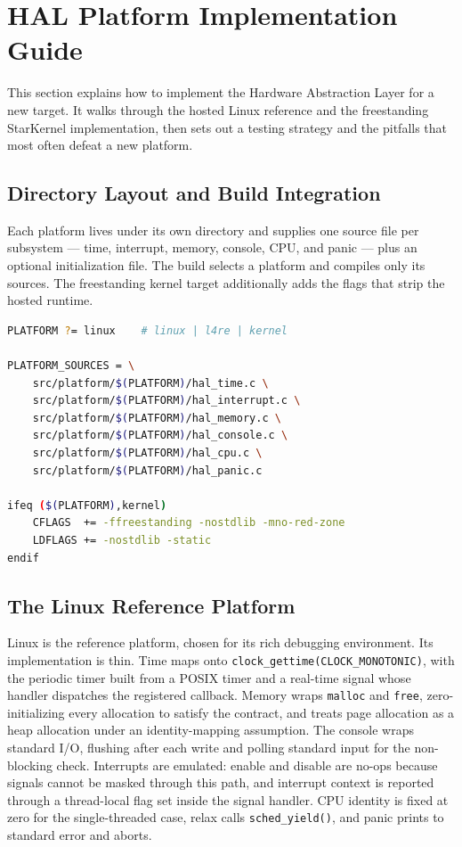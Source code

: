 
\section{HAL Platform Implementation Guide}

This section explains how to implement the Hardware Abstraction Layer for a new
target. It walks through the hosted Linux reference and the freestanding
StarKernel implementation, then sets out a testing strategy and the pitfalls
that most often defeat a new platform.

\subsection{Directory Layout and Build Integration}

Each platform lives under its own directory and supplies one source file per
subsystem --- time, interrupt, memory, console, CPU, and panic --- plus an
optional initialization file. The build selects a platform and compiles only its
sources. The freestanding kernel target additionally adds the flags that strip
the hosted runtime.

\begin{lstlisting}[language=bash]
PLATFORM ?= linux    # linux | l4re | kernel

PLATFORM_SOURCES = \
    src/platform/$(PLATFORM)/hal_time.c \
    src/platform/$(PLATFORM)/hal_interrupt.c \
    src/platform/$(PLATFORM)/hal_memory.c \
    src/platform/$(PLATFORM)/hal_console.c \
    src/platform/$(PLATFORM)/hal_cpu.c \
    src/platform/$(PLATFORM)/hal_panic.c

ifeq ($(PLATFORM),kernel)
    CFLAGS  += -ffreestanding -nostdlib -mno-red-zone
    LDFLAGS += -nostdlib -static
endif
\end{lstlisting}

\subsection{The Linux Reference Platform}

Linux is the reference platform, chosen for its rich debugging environment. Its
implementation is thin. Time maps onto \texttt{clock\_gettime(CLOCK\_MONOTONIC)},
with the periodic timer built from a POSIX timer and a real-time signal whose
handler dispatches the registered callback. Memory wraps \texttt{malloc} and
\texttt{free}, zero-initializing every allocation to satisfy the contract, and
treats page allocation as a heap allocation under an identity-mapping
assumption. The console wraps standard I/O, flushing after each write and polling
standard input for the non-blocking check. Interrupts are emulated: enable and
disable are no-ops because signals cannot be masked through this path, and
interrupt context is reported through a thread-local flag set inside the signal
handler. CPU identity is fixed at zero for the single-threaded case, relax calls
\texttt{sched\_yield()}, and panic prints to standard error and aborts.

